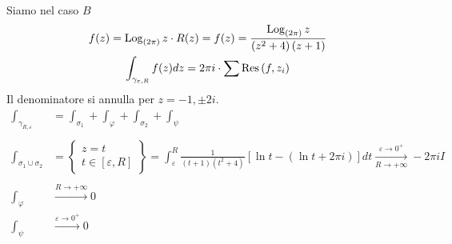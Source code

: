 Siamo nel caso $B$
\begin{gather*}
f(z) = \operatorname{Log}_{\left(2\pi \right)} z \cdot R(z) = f(z) = \frac{\operatorname{Log}_{\left(2\pi \right)} z}{\left(z^{2} + 4\right)\left(z + 1\right)}\\
\int_{\gamma_{\varepsilon, R}} f(z) dz = 2\pi i \cdot \sum \operatorname{Res} \left(f, z_{i}\right)
\end{gather*}
Il denominatore si annulla per $z = -1, \pm 2i$.
\begin{equation*}
\begin{aligned}
\int_{\gamma_{R, \varepsilon}} & = \int_{\sigma_{1}} + \int_{\varphi} + \int_{\sigma_{2}} + \int_{\psi}\\
 & \\
\int_{\sigma_{1} \cup \sigma_{2}} & = \left\{
\begin{array}{c}
z = t\\
t\in \left[ \varepsilon, R\right]
\end{array}\right\} = \int^{R}_{\varepsilon}\frac{1}{\left(t + 1\right)\left(t^{2} + 4\right)}\left[\ln t - \left(\ln t + 2\pi i\right)\right] dt\xrightarrow[R\rightarrow + \infty ]{\varepsilon \rightarrow 0^{+}} - 2\pi iI\\
 & \\
\int_{\varphi} & \xrightarrow{R\rightarrow + \infty} 0\\
\int_{\psi} & \xrightarrow{\varepsilon \rightarrow 0^{+}} 0
\end{aligned}
\end{equation*}
\Soluzione

